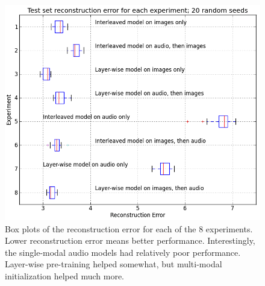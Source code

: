 \documentclass[12pt]{article}
\begin{document}
\begin{doublespacing}
\begin{figure}[p]
\centering
\includegraphics[width=6in]{boxplot}
\caption{Box plots of the reconstruction error for each of the 8 experiments. Lower reconstruction error means better performance. Interestingly, the single-modal audio models had relatively poor performance. Layer-wise pre-training helped somewhat, but multi-modal initialization helped much more.}
\label{fig:boxplots}
\end{figure}
	

\end{doublespacing}
\end{document}
